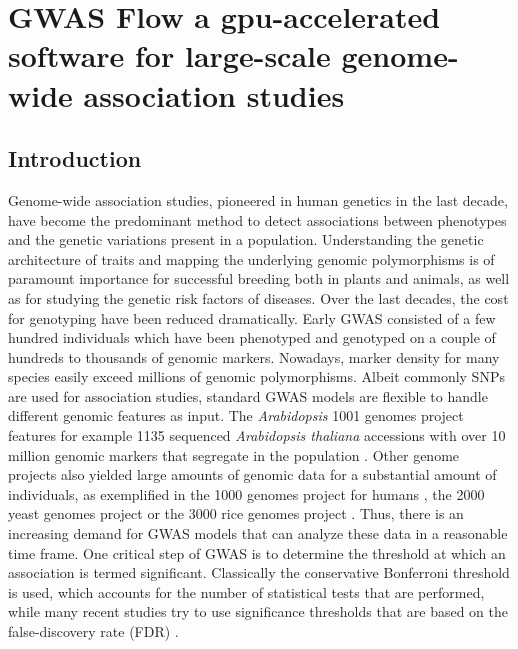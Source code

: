 
\chapter{GWAS Flow a gpu-accelerated software for large-scale genome-wide association studies}

\label{Chapter3} %




\section{Introduction}
Genome-wide association studies, pioneered in human genetics \cite{Hirschhorn2005} in the last decade,
have become the predominant method to detect associations between phenotypes and the genetic variations
present in a population. Understanding the genetic architecture of traits and mapping the underlying genomic
polymorphisms is of paramount importance for successful breeding both in plants and animals, as well as for
studying the genetic risk factors of diseases. 
Over the last decades, the cost for genotyping have been reduced dramatically.
Early GWAS consisted of a few hundred individuals which have been phenotyped and genotyped on a couple of hundreds to
thousands of genomic markers. Nowadays, marker density for many species easily exceed millions of genomic polymorphisms.
Albeit commonly SNPs are used for association studies, standard GWAS models are flexible to handle different genomic features
as input. The \textit{Arabidopsis} 1001 genomes project features for example 1135 sequenced \textit{Arabidopsis thaliana}
accessions with over 10 million genomic markers that segregate in the population \cite{1001genome}. Other genome projects
also yielded large amounts of genomic data for a substantial amount of individuals, as exemplified in the 1000 genomes
project for humans \cite{1000genome}, the 2000 yeast genomes project or the 3000 rice genomes project \cite{3000genome}.
Thus, there is an increasing demand for GWAS models that can analyze these data in a reasonable time frame. 
One critical step of GWAS is to determine the threshold at which an association is termed significant. Classically the
conservative Bonferroni threshold is used, which accounts for the number of statistical tests that are performed, while many
recent studies try to use significance thresholds that are based on the false-discovery rate (FDR) \cite{Storey9440}.
